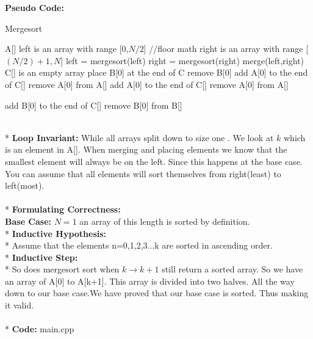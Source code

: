 \documentclass{article}
\begin{document}
	\large{\textbf{Pseudo Code:}
	\begin{algorithm}
		\caption{Mergesort}
		\begin{algorithmic}[1]
			 \Return A[] \EndIf
				\State left is an array with range [0,$N/2$] //floor math
				\State right is an array with range [$(N/2)+1 , N$]
				\State
				\State left = mergesort(left)
				\State right = mergesort(right)
				\State 
				\State \Return merge(left,right)
			\EndWhile
			\EndProcedure
			\State C[] is an empty array
					\State place B[0] at the end of C
					\State remove B[0]
				\Else
					\State add A[0] to the end of C[]
					\State remove A[0] from A[] 
				\EndIf
				\State add A[0] to the end of C[]
				\State remove A[0] from A[]
			\EndWhile
		
			\State add B[0] to the end of C[]
			\State remove B[0] from B[]
		\EndWhile
				
				
			\EndWhile
			
			\EndProcedure
		\end{algorithmic}
	\end{algorithm}
\\*
\large{\textbf{Loop Invariant:}} While all arrays split down to size one . We look at $k$ which is an element in A[]. When merging and placing elements we know that the smallest element will always  be on the left. Since this happens at the base case. You can assume that all elements will sort themselves from right(least) to left(most).
\\
\\*
\large{\textbf{Formulating Correctness:}} \\\textbf{Base Case:} $N = 1$ an array of this length is sorted by definition.\\* \textbf{Inductive Hypothesis:}\\*
\indent Assume that the elements n=0,1,2,3...k are sorted in ascending order.
\\* \large{\textbf{Inductive Step:}}\\*
\indent So does mergesort sort when $k \to k+1$ still return a sorted array. So we have an array of A[0] to A[k+1]. This array is divided into two halves. All the way down to our base case.We have proved that our base case is sorted. Thus making it valid.\\
\\*
\large{\textbf{Code:}} main.cpp

}
\end{document}
